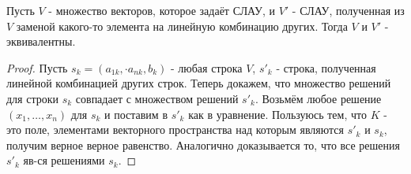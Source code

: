 \begin{theorem}
	Пусть $V$ - множество векторов, которое задаёт СЛАУ, и $V'$ - СЛАУ, полученная из $V$ заменой какого-то элемента на линейную комбинацию других. Тогда $V$ и $V'$ - эквивалентны.
\end{theorem}
\begin{proof}
	Пусть $s_k = (a_{1k}, \cdot a_{nk}, b_k)$ - любая строка $V$, $s'_k$ - строка, полученная линейной комбинацией других строк. Теперь докажем, что множество решений для строки $s_k$ совпадает с множеством решений $s'_k$. Возьмём любое решение $(x_1, \ldots, x_n)$ для $s_k$ и поставим в $s'_k$ как в уравнение. Пользуюсь тем, что $K$ - это поле, элементами векторного пространства над которым являются $s'_k$ и $s_k$, получим верное верное равенство. Аналогично доказывается то, что все решения $s'_k$ яв-ся решениями $s_k$.
\end{proof}





